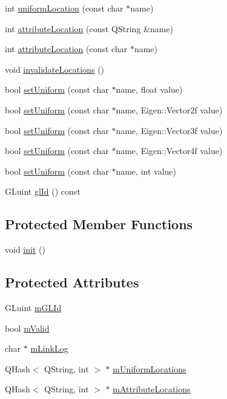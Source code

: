 \begin{CompactItemize}
\item 
int \hyperlink{class_k_g_l_program_9e38df2dc72639004319fef0c169e3c9}{uniformLocation} (const char $\ast$name)
\item 
int \hyperlink{class_k_g_l_program_16d1cc930ef9585ec503fe935c4b6a9f}{attributeLocation} (const QString \&name)
\item 
int \hyperlink{class_k_g_l_program_237f2223b1ba1c80e90543d0523739c4}{attributeLocation} (const char $\ast$name)
\item 
void \hyperlink{class_k_g_l_program_949c83395eed27219fd984fe33ac9ecf}{invalidateLocations} ()
\item 
bool \hyperlink{class_k_g_l_program_6704e664e129126050b6f5609da1ee61}{setUniform} (const char $\ast$name, float value)
\item 
bool \hyperlink{class_k_g_l_program_a3213a9de09529704183cb61bec910d4}{setUniform} (const char $\ast$name, Eigen::Vector2f value)
\item 
bool \hyperlink{class_k_g_l_program_e971d4c55c57ae853f4d1c8cdd8a22b9}{setUniform} (const char $\ast$name, Eigen::Vector3f value)
\item 
bool \hyperlink{class_k_g_l_program_b5a31ac9ea1f50767144233afaa0a9e3}{setUniform} (const char $\ast$name, Eigen::Vector4f value)
\item 
bool \hyperlink{class_k_g_l_program_4d943d685f583e9a446d44689b6e7b0c}{setUniform} (const char $\ast$name, int value)
\item 
GLuint \hyperlink{class_k_g_l_program_7a9b4ef4da3e149386a50c8d4241b6c6}{glId} () const 
\end{CompactItemize}
\subsection*{Protected Member Functions}
\begin{CompactItemize}
\item 
void \hyperlink{class_k_g_l_program_5c8081f85275e023d6bf034d54bd1721}{init} ()
\end{CompactItemize}
\subsection*{Protected Attributes}
\begin{CompactItemize}
\item 
GLuint \hyperlink{class_k_g_l_program_1200bdd28e580ca66b818dbefee24f22}{mGLId}
\item 
bool \hyperlink{class_k_g_l_program_f228db2a0bcddd2366e1353b25a193dc}{mValid}
\item 
char $\ast$ \hyperlink{class_k_g_l_program_af8102a5a3f4c7bb21f3f0c56c6806a4}{mLinkLog}
\item 
QHash$<$ QString, int $>$ $\ast$ \hyperlink{class_k_g_l_program_b6b870ec76b667369f457cc980e9016c}{mUniformLocations}
\item 
QHash$<$ QString, int $>$ $\ast$ \hyperlink{class_k_g_l_program_7ebfd6e8476719c40d24108a043d7bd1}{mAttributeLocations}
\end{CompactItemize}


